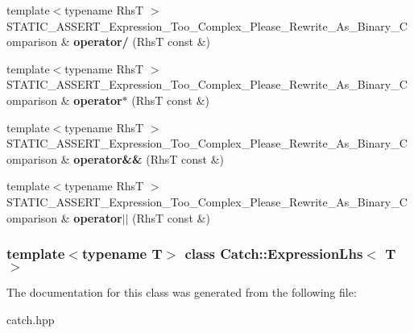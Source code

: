 \begin{DoxyCompactItemize}
\item 
\hypertarget{classCatch_1_1ExpressionLhs_a7bad73533191229ecd1f3f442c55afe4}{
{\footnotesize template$<$typename RhsT $>$ }\\STATIC\_\-ASSERT\_\-Expression\_\-Too\_\-Complex\_\-Please\_\-Rewrite\_\-As\_\-Binary\_\-Comparison \& {\bfseries operator/} (RhsT const \&)}
\label{classCatch_1_1ExpressionLhs_a7bad73533191229ecd1f3f442c55afe4}

\item 
\hypertarget{classCatch_1_1ExpressionLhs_a33ceabafb307cc157affcf757268afca}{
{\footnotesize template$<$typename RhsT $>$ }\\STATIC\_\-ASSERT\_\-Expression\_\-Too\_\-Complex\_\-Please\_\-Rewrite\_\-As\_\-Binary\_\-Comparison \& {\bfseries operator$\ast$} (RhsT const \&)}
\label{classCatch_1_1ExpressionLhs_a33ceabafb307cc157affcf757268afca}

\item 
\hypertarget{classCatch_1_1ExpressionLhs_accd8b3d578396683051c627ba3aad54d}{
{\footnotesize template$<$typename RhsT $>$ }\\STATIC\_\-ASSERT\_\-Expression\_\-Too\_\-Complex\_\-Please\_\-Rewrite\_\-As\_\-Binary\_\-Comparison \& {\bfseries operator\&\&} (RhsT const \&)}
\label{classCatch_1_1ExpressionLhs_accd8b3d578396683051c627ba3aad54d}

\item 
\hypertarget{classCatch_1_1ExpressionLhs_a9c4d46ff802ded562c6eaa88df968c7f}{
{\footnotesize template$<$typename RhsT $>$ }\\STATIC\_\-ASSERT\_\-Expression\_\-Too\_\-Complex\_\-Please\_\-Rewrite\_\-As\_\-Binary\_\-Comparison \& {\bfseries operator$|$$|$} (RhsT const \&)}
\label{classCatch_1_1ExpressionLhs_a9c4d46ff802ded562c6eaa88df968c7f}

\end{DoxyCompactItemize}
\subsubsection*{template$<$typename T$>$ class Catch::ExpressionLhs$<$ T $>$}



The documentation for this class was generated from the following file:\begin{DoxyCompactItemize}
\item 
catch.hpp\end{DoxyCompactItemize}
